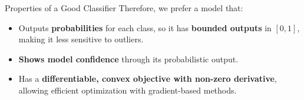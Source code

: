 \documentclass[serif, aspectratio=169]{beamer}
\begin{document}
\begin{frame}{Properties of a Good Classifier}
     Therefore, we prefer a model that:
        \begin{itemize}
            \item Outputs \textbf{probabilities} for each class, so it has \textbf{bounded outputs} in $[0, 1]$, making it less sensitive to outliers.
            \item \textbf{Shows model confidence} through its probabilistic output.
            \item Has a \textbf{differentiable, convex objective with non-zero derivative}, allowing efficient optimization with gradient-based methods.
        \end{itemize}
\end{frame}




\end{document}
